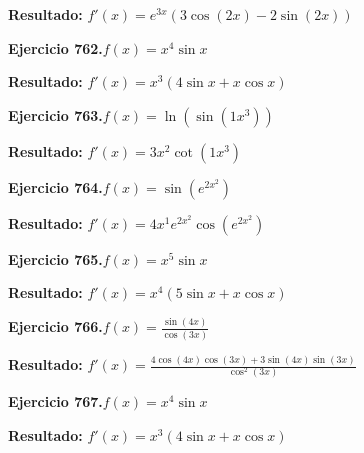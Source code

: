 \documentclass[10pt,a4paper]{article}
\begin{document}
\begin{solbox}
\textbf{Resultado:} \(\displaystyle f'(x) = e^{3x}(3\cos(2x) - 2\sin(2x))\)
\end{solbox}

\begin{ejbox}
\textbf{Ejercicio 762.}\quad $f(x) = x^{4} \sin x$
\end{ejbox}

\begin{solbox}
\textbf{Resultado:} \(\displaystyle f'(x) = x^{3}(4\sin x + x\cos x)\)
\end{solbox}

\newpage
\begin{ejbox}
\textbf{Ejercicio 763.}\quad $f(x) = \ln(\sin(1x^{3}))$
\end{ejbox}

\begin{solbox}
\textbf{Resultado:} \(\displaystyle f'(x) = 3x^{2}\cot(1x^{3})\)
\end{solbox}

\begin{ejbox}
\textbf{Ejercicio 764.}\quad $f(x) = \sin(e^{2x^{2}})$
\end{ejbox}

\begin{solbox}
\textbf{Resultado:} \(\displaystyle f'(x) = 4x^{1}e^{2x^{2}}\cos(e^{2x^{2}})\)
\end{solbox}

\begin{ejbox}
\textbf{Ejercicio 765.}\quad $f(x) = x^{5} \sin x$
\end{ejbox}

\begin{solbox}
\textbf{Resultado:} \(\displaystyle f'(x) = x^{4}(5\sin x + x\cos x)\)
\end{solbox}

\newpage
\begin{ejbox}
\textbf{Ejercicio 766.}\quad $f(x) = \frac{\sin(4x)}{\cos(3x)}$
\end{ejbox}

\begin{solbox}
\textbf{Resultado:} \(\displaystyle f'(x) = \frac{4\cos(4x)\cos(3x) + 3\sin(4x)\sin(3x)}{\cos^2(3x)}\)
\end{solbox}

\begin{ejbox}
\textbf{Ejercicio 767.}\quad $f(x) = x^{4} \sin x$
\end{ejbox}

\begin{solbox}
\textbf{Resultado:} \(\displaystyle f'(x) = x^{3}(4\sin x + x\cos x)\)
\end{solbox}
\end{document}
